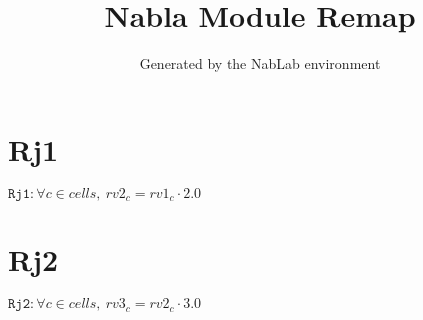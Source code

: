 \documentclass[11pt]{article}
\title{Nabla Module Remap}
\author{Generated by the NabLab environment}
\begin{document}
\maketitle


\section{Rj1}
$\texttt{Rj1} : \forall{c\in cells}, \ rv2_{c} = rv1_{c} \cdot 2.0$


\section{Rj2}
$\texttt{Rj2} : \forall{c\in cells}, \ rv3_{c} = rv2_{c} \cdot 3.0$
\end{document}
